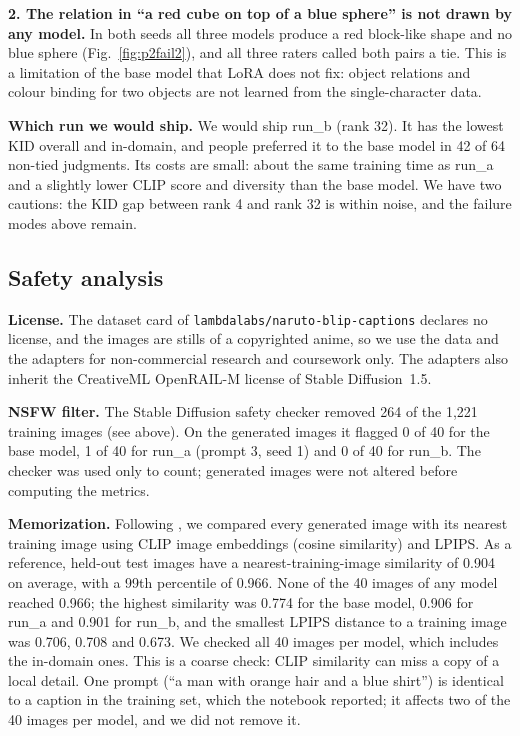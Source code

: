 \textbf{2. The relation in ``a red cube on top of a blue sphere'' is not drawn by any model.} In both seeds all three models produce a red block-like shape and no blue sphere (Fig.~\ref{fig:p2fail2}), and all three raters called both pairs a tie. This is a limitation of the base model that LoRA does not fix: object relations and colour binding for two objects are not learned from the single-character data.

\textbf{Which run we would ship.} We would ship run\_b (rank 32). It has the lowest KID overall and in-domain, and people preferred it to the base model in 42 of 64 non-tied judgments. Its costs are small: about the same training time as run\_a and a slightly lower CLIP score and diversity than the base model. We have two cautions: the KID gap between rank 4 and rank 32 is within noise, and the failure modes above remain.

\subsection{Safety analysis}
\textbf{License.} The dataset card of \texttt{lambdalabs/naruto-blip-captions} declares no license, and the images are stills of a copyrighted anime, so we use the data and the adapters for non-commercial research and coursework only. The adapters also inherit the CreativeML OpenRAIL-M license of Stable Diffusion~1.5.

\textbf{NSFW filter.} The Stable Diffusion safety checker removed 264 of the 1{,}221 training images (see above). On the generated images it flagged 0 of 40 for the base model, 1 of 40 for run\_a (prompt 3, seed 1) and 0 of 40 for run\_b. The checker was used only to count; generated images were not altered before computing the metrics.

\textbf{Memorization.} Following \cite{carlini}, we compared every generated image with its nearest training image using CLIP image embeddings (cosine similarity) and LPIPS. As a reference, held-out test images have a nearest-training-image similarity of 0.904 on average, with a 99th percentile of 0.966. None of the 40 images of any model reached 0.966; the highest similarity was 0.774 for the base model, 0.906 for run\_a and 0.901 for run\_b, and the smallest LPIPS distance to a training image was 0.706, 0.708 and 0.673. We checked all 40 images per model, which includes the in-domain ones. This is a coarse check: CLIP similarity can miss a copy of a local detail. One prompt (``a man with orange hair and a blue shirt'') is identical to a caption in the training set, which the notebook reported; it affects two of the 40 images per model, and we did not remove it.

